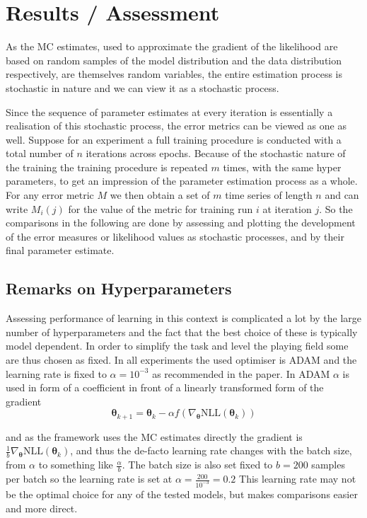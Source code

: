 
\section{Results / Assessment}

As the MC estimates, used to approximate the gradient of the likelihood are based on random samples of the model distribution and the data distribution respectively,
are themselves random variables, the entire estimation process is stochastic in nature and we can view it as a stochastic process.

Since the sequence of parameter estimates at every iteration is essentially a realisation of this stochastic process, the error metrics can be viewed as one as well.
Suppose for an experiment a full training procedure is conducted with a total number of $n$ iterations across epochs.
Because of the stochastic nature of the training the training procedure is repeated $m$ times, with the same hyper parameters, 
to get an impression of the parameter estimation process as a whole.
For any error metric $M$ we then obtain a set of $m$ time series of length $n$ and can write $M_i (j)$ for the value of the metric for training run $i$ at iteration $j$.
So the comparisons in the following are done by assessing and plotting the development of the error measures or likelihood values as stochastic processes,
and by their final parameter estimate.


\subsection{Remarks on Hyperparameters}

Assessing performance of learning in this context is complicated a lot by the large number of hyperparameters 
and the fact that the best choice of these is typically model dependent.
In order to simplify the task and level the playing field some are thus chosen as fixed.
In all experiments the used optimiser is ADAM \cite{Kingma2014AdamAM} and the learning rate is fixed to $\alpha = 10^{-3}$ as recommended in the paper.
In ADAM $\alpha$ is used in form of a coefficient in front of a linearly transformed form of the gradient
\[
	\bm{\theta}_{k+1} = \bm{\theta}_k - \alpha f( \nabla_{\bm{\theta}} \text{NLL}(\bm{\theta}_k) )
\]

and as the framework uses the MC estimates directly the gradient is $\frac{1}{b} \nabla_{\bm{\theta}} \text{NLL}(\bm{\theta}_k)$, 
and thus the de-facto learning rate changes with the batch size, from $\alpha$ to something like $\frac{\alpha}{b}$.
The batch size is also set fixed to $b = 200$ samples per batch so the learning rate is set at $\alpha = \frac{200}{10^{-3}} = 0.2$
This learning rate may not be the optimal choice for any of the tested models, but makes comparisons easier and more direct.


